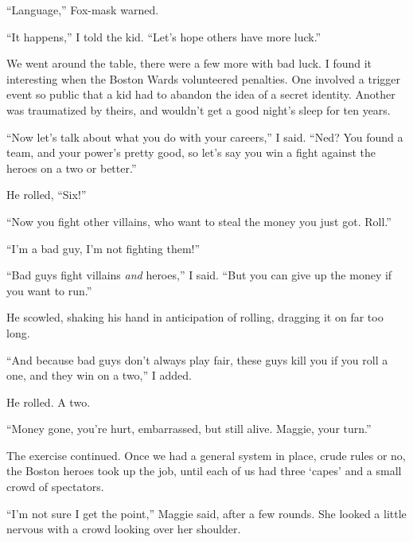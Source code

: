 ``Language,'' Fox-mask warned.



``It happens,'' I told the kid.  ``Let's hope others have more luck.''



We went around the table, there were a few more with bad luck.  I found it interesting when the Boston Wards volunteered penalties.  One involved a trigger event so public that a kid had to abandon the idea of a secret identity.  Another was traumatized by theirs, and wouldn't get a good night's sleep for ten years.



``Now let's talk about what you do with your careers,'' I said.  ``Ned?  You found a team, and your power's pretty good, so let's say you win a fight against the heroes on a two or better.''



He rolled, ``Six!''



``Now you fight other villains, who want to steal the money you just got.  Roll.''



``I'm a bad guy, I'm not fighting them!''



``Bad guys fight villains \emph{and} heroes,'' I said.  ``But you can give up the money if you want to run.''



He scowled, shaking his hand in anticipation of rolling, dragging it on far too long.



``And because bad guys don't always play fair, these guys kill you if you roll a one, and they win on a two,'' I added.



He rolled.  A two.



``Money gone, you're hurt, embarrassed, but still alive.  Maggie, your turn.''



The exercise continued.  Once we had a general system in place, crude rules or no, the Boston heroes took up the job, until each of us had three `capes' and a small crowd of spectators.



``I'm not sure I get the point,'' Maggie said, after a few rounds.  She looked a little nervous with a crowd looking over her shoulder.



